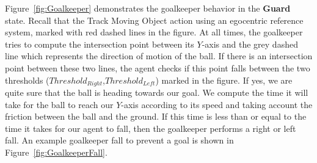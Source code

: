 Figure~\ref{fig:Goalkeeper} demonstrates the goalkeeper behavior in the \textbf{Guard} state. Recall that the Track Moving Object action using an egocentric reference system, marked with red dashed lines in the figure. At all times, the goalkeeper tries to compute the intersection point between its $Y$-axis and the grey dashed line which represents the direction of motion of the ball. If there is an intersection point between these two lines, the agent checks if this point falls between the two thresholds ($Threshold_{Right}$,$Threshold_{Left}$) marked in the figure. If yes, we are quite sure that the ball is heading towards our goal. We compute the time it will take for the ball to reach our $Y$-axis according to its speed and taking account the friction between the ball and the ground. If this time is less than or equal to the time it takes for our agent to fall, then the goalkeeper performs a right or left fall. An example goalkeeper fall to prevent a goal is shown in Figure~\ref{fig:GoalkeeperFall}. 


